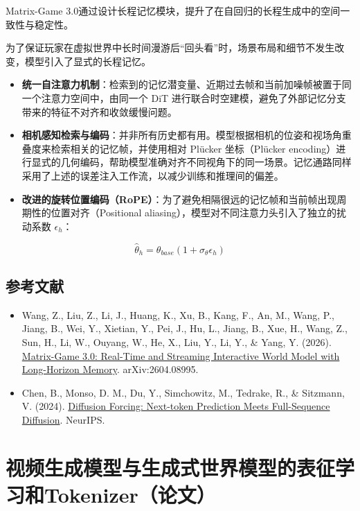 Matrix-Game 3.0通过设计长程记忆模块，提升了在自回归的长程生成中的空间一致性与稳定性。

为了保证玩家在虚拟世界中长时间漫游后``回头看''时，场景布局和细节不发生改变，模型引入了显式的长程记忆。

\begin{itemize}
\tightlist
\item
  \textbf{统一自注意力机制}：检索到的记忆潜变量、近期过去帧和当前加噪帧被置于同一个注意力空间中，由同一个 DiT 进行联合时空建模，避免了外部记忆分支带来的特征不对齐和收敛缓慢问题。
\item
  \textbf{相机感知检索与编码}：并非所有历史都有用。模型根据相机的位姿和视场角重叠度来检索相关的记忆帧，并使用相对 Plücker 坐标（Plücker encoding）进行显式的几何编码，帮助模型准确对齐不同视角下的同一场景。记忆通路同样采用了上述的误差注入工作流，以减少训练和推理间的偏差。
\item
  \textbf{改进的旋转位置编码（RoPE）}：为了避免相隔很远的记忆帧和当前帧出现周期性的位置对齐（Positional aliasing），模型对不同注意力头引入了独立的扰动系数 \(\epsilon_h\)：
\end{itemize}

\[
\hat{\theta}_h = \theta_{base}(1 + \sigma_{\theta}\epsilon_h)
\]

\hypertarget{ux53c2ux8003ux6587ux732e-181}{%
\subsection{参考文献}\label{ux53c2ux8003ux6587ux732e-181}}

\begin{itemize}
\tightlist
\item
  Wang, Z., Liu, Z., Li, J., Huang, K., Xu, B., Kang, F., An, M., Wang, P., Jiang, B., Wei, Y., Xietian, Y., Pei, J., Hu, L., Jiang, B., Xue, H., Wang, Z., Sun, H., Li, W., Ouyang, W., He, X., Liu, Y., Li, Y., \& Yang, Y. (2026). \href{https://arxiv.org/abs/2604.08995}{Matrix-Game 3.0: Real-Time and Streaming Interactive World Model with Long-Horizon Memory}. arXiv:2604.08995.
\item
  Chen, B., Monso, D. M., Du, Y., Simchowitz, M., Tedrake, R., \& Sitzmann, V. (2024). \href{https://arxiv.org/abs/2407.01392}{Diffusion Forcing: Next-token Prediction Meets Full-Sequence Diffusion}. NeurIPS.
\end{itemize}

\clearpage

\hypertarget{ux89c6ux9891ux751fux6210ux6a21ux578bux4e0eux751fux6210ux5f0fux4e16ux754cux6a21ux578bux7684ux8868ux5f81ux5b66ux4e60ux548ctokenizerux8bbaux6587}{%
\section{视频生成模型与生成式世界模型的表征学习和Tokenizer（论文）}\label{ux89c6ux9891ux751fux6210ux6a21ux578bux4e0eux751fux6210ux5f0fux4e16ux754cux6a21ux578bux7684ux8868ux5f81ux5b66ux4e60ux548ctokenizerux8bbaux6587}}

